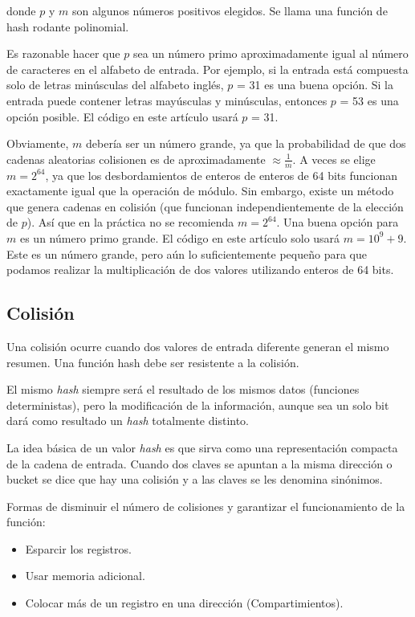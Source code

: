 donde $p$ y $m$ son algunos números positivos elegidos. Se llama una función de hash rodante polinomial.

Es razonable hacer que $p$ sea un número primo aproximadamente igual al número de caracteres en el alfabeto de entrada. Por ejemplo, si la entrada está compuesta solo de letras minúsculas del alfabeto inglés, $p$ = 31 es una buena opción. Si la entrada puede contener letras mayúsculas y minúsculas, entonces $p$ = 53 es una opción posible. El código en este artículo usará $p$ = 31.

Obviamente, $m$ debería ser un número grande, ya que la probabilidad de que dos cadenas aleatorias colisionen es de aproximadamente $\approx \frac{1}{m}$. A veces se elige $m = 2^{64}$, ya que los desbordamientos de enteros de enteros de 64 bits funcionan exactamente igual que la operación de módulo. Sin embargo, existe un método que genera cadenas en colisión (que funcionan independientemente de la elección de $p$). Así que en la práctica no se recomienda $m = 2^{64}$. Una buena opción para $m$ es un número primo grande. El código en este artículo solo usará $m = 10^9+9$. Este es un número grande, pero aún lo suficientemente pequeño para que podamos realizar la multiplicación de dos valores utilizando enteros de 64 bits.

\subsection{Colisión}
Una colisión ocurre cuando dos valores de entrada diferente generan el mismo resumen. Una función hash debe ser resistente a la colisión.

El mismo \emph{hash} siempre será el resultado de los mismos datos (funciones deterministas), pero la modificación de la información, aunque sea un solo bit dará como resultado un \emph{hash} totalmente distinto.

La idea básica de un valor \emph{hash} es que sirva como una representación compacta de la cadena de entrada. Cuando dos claves se apuntan a la misma dirección o bucket se dice que hay una colisión y a las claves se les denomina sinónimos.

Formas de disminuir el número de colisiones y garantizar el funcionamiento de la función:

\begin{itemize}
	\item Esparcir los registros.
	\item Usar memoria adicional.
	\item Colocar más de un registro en una dirección (Compartimientos).
\end{itemize}

